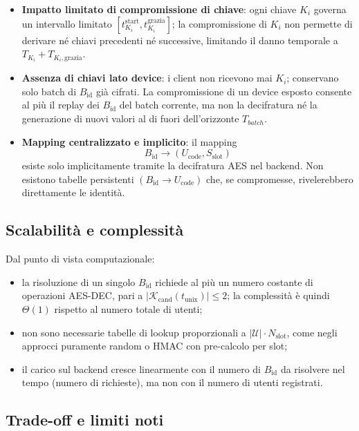 \documentclass[a4paper,11pt]{article}
\begin{document}
\begin{itemize}
  \item \textbf{Impatto limitato di compromissione di chiave}: ogni chiave \(K_i\) governa un
        intervallo limitato \([t_{K_i}^{\text{start}}, t_{K_i}^{\text{grazia}}]\); la compromissione
        di \(K_i\) non permette di derivare né chiavi precedenti né successive, limitando il danno
        temporale a \(T_{K_i} + T_{K_i,\mathrm{grazia}}\).
  \item \textbf{Assenza di chiavi lato device}: i client non ricevono mai \(K_i\); conservano solo
        batch di \(B_{\text{id}}\) già cifrati. La compromissione di un device esposto consente
        al più il replay dei \(B_{\text{id}}\) del batch corrente, ma non la decifratura né la
        generazione di nuovi valori al di fuori dell’orizzonte \(T_{batch}\).
  \item \textbf{Mapping centralizzato e implicito}: il mapping
        \[
          B_{\text{id}} \longrightarrow (U_{\text{code}}, S_{\text{slot}})
        \]
        esiste solo implicitamente tramite la decifratura AES nel backend. Non esistono tabelle
        persistenti \((B_{\text{id}} \to U_{\text{code}})\) che, se compromesse, rivelerebbero
        direttamente le identità.
\end{itemize}

\subsection{Scalabilità e complessità}

Dal punto di vista computazionale:

\begin{itemize}
  \item la risoluzione di un singolo \(B_{\text{id}}\) richiede al più un numero costante di
        operazioni AES-DEC, pari a \(|\mathcal{K}_{\mathrm{cand}}(t_{\text{unix}})| \le 2\); la
        complessità è quindi \(\Theta(1)\) rispetto al numero totale di utenti;
  \item non sono necessarie tabelle di lookup proporzionali a
        \( |\mathcal{U}| \cdot N_{\text{slot}} \), come negli approcci puramente random o HMAC
        con pre-calcolo per slot;
  \item il carico sul backend cresce linearmente con il numero di \(B_{\text{id}}\) da risolvere
        nel tempo (numero di richieste), ma non con il numero di utenti registrati.
\end{itemize}

\subsection{Trade-off e limiti noti}
\end{document}

